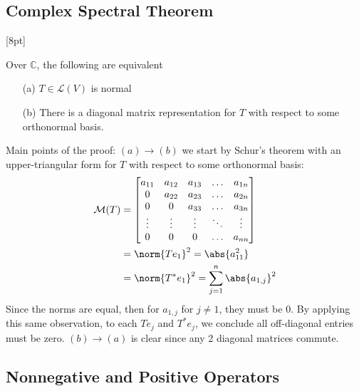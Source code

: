 \documentclass{article}
\begin{document}
\begin{topic}
	\section*{Complex Spectral Theorem}
\end{topic}

[8pt]
\begin{theorem}[frametitle={Complex Spectral Theorem}]
	Over $\mathbb{C}$, the following are equivalent

\begin{enumerate}
	\item [(a)] $T \in \mathcal{L}(V)$ is normal 

	\item [(b)] There is a diagonal matrix representation for $T$ with respect to some orthonormal basis.
\end{enumerate}
\end{theorem}

Main points of the proof: $(a) \rightarrow (b)$ we start by Schur's theorem with an upper-triangular form for $T$ with respect to some orthonormal basis:
\begin{align*}
	\mathcal{M}(T) &= \begin{bmatrix} a_{11} & a_{12} & a_{13} & \ldots & a_{1n} \\
	0 & a_{22} & a_{23} & \ldots& a_{2n} \\
0 & 0  & a_{33} & \ldots & a_{3n} \\
\vdots & \vdots &\vdots & \ddots & \vdots \\ 0 & 0 & 0 & \ldots & a_{nn}
\end{bmatrix}\\
		       &= \norm{Te_{1}}^{2} = \abs{a_{11}^{2}}\\
		       &=\norm{T^{*}e_{1}}^{2} = \sum_{j = 1}^{n} \abs{a_{1,j}}^{2} 
\end{align*}
Since the norms are equal, then for $a_{1,j}$ for $j \neq 1$, they must be 0. By applying this same observation, to each $Te_{j}$ and $T^{*}e_{j}$, we conclude all off-diagonal entries must be zero. $(b) \rightarrow (a)$ is clear since any 2 diagonal matrices commute.

\begin{topic}
	\section*{Nonnegative and Positive Operators}
\end{topic}
\end{document}
